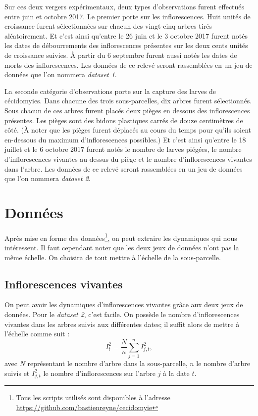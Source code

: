 Sur ces deux vergers expérimentaux, deux types d'observations furent effectués entre juin et octobre 2017. 
Le premier porte sur les inflorescences. 
Huit unités de croissance furent sélectionnées sur chacun des vingt-cinq arbres tirés aléatoirement. 
Et c'est ainsi qu'entre le 26 juin et le 3 octobre 2017 furent notés les dates de débourrements des inflorescences présentes sur les deux cents unités de croissance suivies.
À partir du 6 septembre furent aussi notés les dates de morts des inflorescences. 
Les données de ce relevé seront rassemblées en un jeu de données que l'on nommera \emph{dataset 1}.

La seconde catégorie d'observations porte sur la capture des larves de cécidomyies.
Dans chacune des trois sous-parcelles, dix arbres furent sélectionnés. 
Sous chacun de ces arbres furent placés deux pièges en dessous des inflorescences présentes.
Les pièges sont des bidons plastiques carrés de douze centimètres de côté.
(À noter que les pièges furent déplacés au cours du temps pour qu'ils soient en-dessous du maximum d'inflorescences possibles.)
Et c'est ainsi qu'entre le 18 juillet et le 6 octobre 2017 furent notés le nombre de larves piégées, le nombre d'inflorescences vivantes au-dessus du piège et le nombre d'inflorescences vivantes dans l'arbre.
Les données de ce relevé seront rassemblées en un jeu de données que l'on nommera \emph{dataset 2}.

\section{Données}

Après mise en forme des données\footnote{Tous les scripts utilisés sont disponibles à l'adresse \url{https://github.com/bastienreyne/cecidomyie}}, on peut extraire les dynamiques qui nous intéressent.
Il faut cependant noter que les deux jeux de données n'ont pas la même échelle.
On choisira de tout mettre à l'échelle de la sous-parcelle.

\subsection{Inflorescences vivantes}

On peut avoir les dynamiques d'inflorescences vivantes grâce aux deux jeux de données.
Pour le \emph{dataset 2}, c'est facile. 
On possède le nombre d'inflorescences vivantes dans les arbres suivis aux différentes dates; il suffit alors de mettre à l'échelle comme suit :
\[
I_{t}^{2} = \frac{N}{n}\sum_{j=1}^{n} I^{2}_{j, t},
\]
avec $N$ représentant le nombre d'arbre dans la sous-parcelle, $n$ le nombre d'arbre suivis et $I^{2}_{j, t}$ le nombre d'inflorescences sur l'arbre $j$ à la date $t$.


